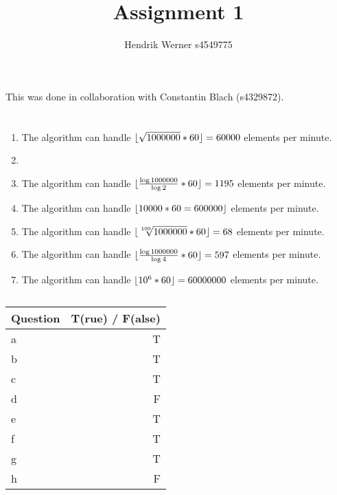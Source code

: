 \documentclass[12pt]{article}
\title {Assignment 1}
\author {Hendrik Werner s4549775}
\DeclarePairedDelimiter\floor{\lfloor}{\rfloor}
\begin{document}
\maketitle

This was done in collaboration with Constantin Blach (s4329872).

\section{} %
\subsection{} %
\begin{enumerate}[a]
	\item %
	The algorithm can handle $\floor{\sqrt{1000000} * 60} = 60000$ elements per minute.

	\item %
	\item %
	The algorithm can handle $\floor{\frac{\log{1000000}}{\log{2}} * 60} = 1195$ elements per minute.

	\item %
	The algorithm can handle $\floor{10000 * 60 = 600000}$ elements per minute.

	\item %
	The algorithm can handle $\floor{\sqrt[100]{1000000} * 60} = 68$ elements per minute.

	\item %
	The algorithm can handle $\floor{\frac{\log{1000000}}{\log{4}} * 60} = 597$ elements per minute.

	\item %
	The algorithm can handle $\floor{10^6 * 60} = 60000000$ elements per minute.
\end{enumerate}

\subsection{} %
\begin{tabular}{|l|r|}
	\hline
	Question & T(rue) / F(alse) \\
	\hline
	a & T\\
	b & T\\
	c & T\\
	d & F\\
	e & T\\
	f & T\\
	g & T\\
	h & F\\
	\hline
\end{tabular}
\end{document}
